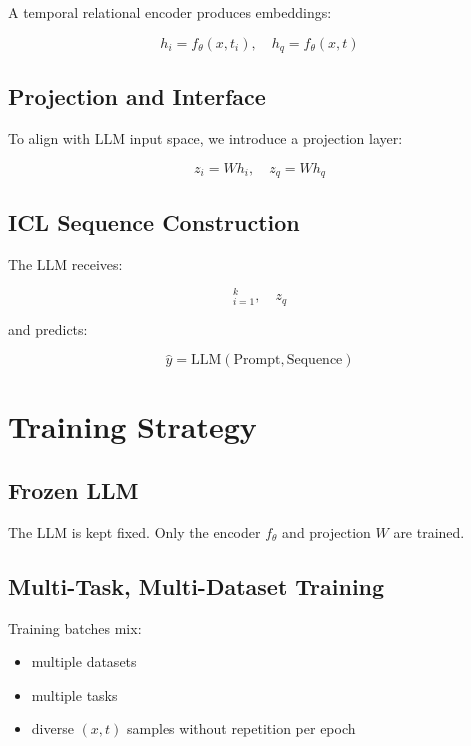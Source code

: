 \documentclass[11pt]{article}
\begin{document}
A temporal relational encoder produces embeddings:

\begin{equation}
h_i = f_\theta(x, t_i), \quad h_q = f_\theta(x, t)
\end{equation}

\subsection{Projection and Interface}

To align with LLM input space, we introduce a projection layer:

\begin{equation}
z_i = W h_i, \quad z_q = W h_q
\end{equation}

\subsection{ICL Sequence Construction}

The LLM receives:

\begin{equation}
[(z_i, y_i)]_{i=1}^{k}, \quad z_q
\end{equation}

and predicts:

\begin{equation}
\hat{y} = \text{LLM}(\text{Prompt}, \text{Sequence})
\end{equation}

\section{Training Strategy}

\subsection{Frozen LLM}

The LLM is kept fixed. Only the encoder $f_\theta$ and projection $W$ are trained.

\subsection{Multi-Task, Multi-Dataset Training}

Training batches mix:
\begin{itemize}
\item multiple datasets
\item multiple tasks
\item diverse $(x,t)$ samples without repetition per epoch
\end{itemize}
\end{document}
